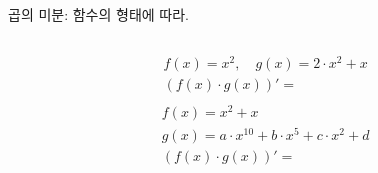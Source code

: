 \documentclass[aspectratio=169]{beamer}
\begin{document}
\begin{frame}{곱의 미분: 함수의 형태에 따라.}
  \begin{columns}
    \begin{column}{.5\textwidth}
      \begin{align*}
        & f(x) = x^2 , \quad g(x) = 2 \cdot x^2 + x \\
        & (f(x) \cdot g(x))' = \\
      \end{align*}
      \begin{align*}
        & f(x) = x^2 + x \\
        & g(x) = a \cdot x^{10} + b \cdot x^5 + c \cdot x^2 + d \\
        & (f(x) \cdot g(x))' = \\
      \end{align*}  
    \end{column}
  \end{columns}
\end{frame}
\end{document}

